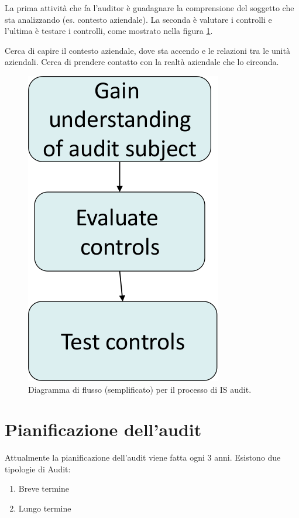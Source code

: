 La prima attività che fa l'auditor è guadagnare la comprensione del soggetto che 
sta analizzando (es. contesto aziendale).
La seconda è valutare i controlli e l'ultima è testare i controlli, come mostrato nella figura \ref{fig:is:audit:definition}.


Cerca di capire il contesto aziendale, dove sta accendo e le relazioni tra le 
unità aziendali. Cerca di prendere contatto con la realtà aziendale che lo 
circonda.


\begin{figure}[h!]
	\begin{center}
		\includegraphics[scale=0.4]{res/img/is_audit_definition.png}
	\end{center}
	\caption{Diagramma di flusso (semplificato) per il processo di IS audit.}
	\label{fig:is:audit:definition}
\end{figure}

\section{Pianificazione dell'audit}

Attualmente la pianificazione dell'audit viene fatta ogni 3 anni.
Esistono due tipologie di Audit:
\begin{enumerate}
\item Breve termine 
\item Lungo termine

\end{enumerate}

